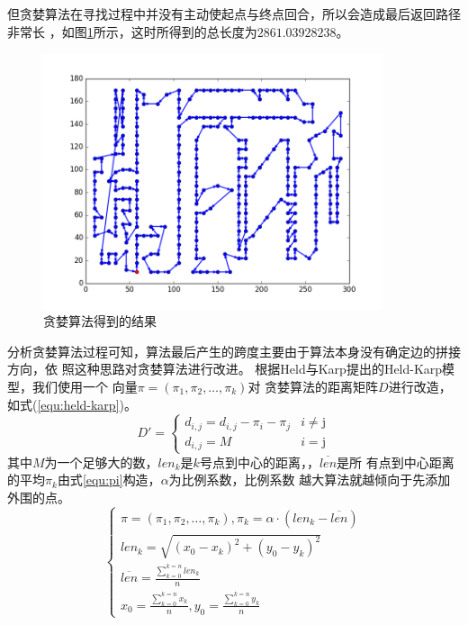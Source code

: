 \documentclass[fontset=windows,a4paper,12pt]{ctexart}
\begin{document}
         但贪婪算法在寻找过程中并没有主动使起点与终点回合，所以会造成最后返回路径非常长
         ，如图\ref{fig:fail}所示，这时所得到的总长度为$2861.03928238$。
         \begin{figure}[htbp]
            \centering
            \includegraphics[width=10cm]{pic/greedy_fail.png}
            \caption{贪婪算法得到的结果}
            \label{fig:fail}
        \end{figure}
        分析贪婪算法过程可知，算法最后产生的跨度主要由于算法本身没有确定边的拼接方向，依
        照这种思路对贪婪算法进行改进。
        根据Held与Karp提出的Held-Karp模型\cite{held1970traveling}，我们使用一个
        向量$\pi=(\pi_1,\pi_2,\dots,\pi_k)$对
        贪婪算法的距离矩阵$D$进行改造，如式(\ref{equ:held-karp})。
        \begin{equation}
	        D'=\left\{
		        \begin{array}{ll}
		        	d_{i,j} = d_{i,j} - \pi_i - \pi_j & \textrm{$i \neq $j}\\
		        	d_{i,j} = M & \textrm{$i=$j}
		        \end{array}
	        \right.
	        \label{equ:held-karp}
        \end{equation}
        其中$M$为一个足够大的数，$len_k$是$k$号点到中心的距离，，$\overline{len}$是所
        有点到中心距离的平均$\pi_k$由式\ref{equ:pi}构造，$\alpha$为比例系数，比例系数
        越大算法就越倾向于先添加外围的点。
        \begin{equation}
             \left\{
	             \begin{array}{l}
		             \pi=(\pi_1,\pi_2,\dots{,\pi_k}),\pi_k=\alpha\cdot(len_k-\overline{len})\\
		             len_k = \sqrt{(x_0-x_k)^2+(y_0-y_k)^2}\\
		             \overline{len} = \frac{\sum_{k=0}^{k=n}len_k}{n}\\
		             x_0 = \frac{\sum_{k=0}^{k=n}x_k}{n},y_0 = \frac{\sum_{k=0}^{k=n}y_k}{n}
	             \end{array}
             \right.
             \label{equ:pi}
        \end{equation}
\end{document}
